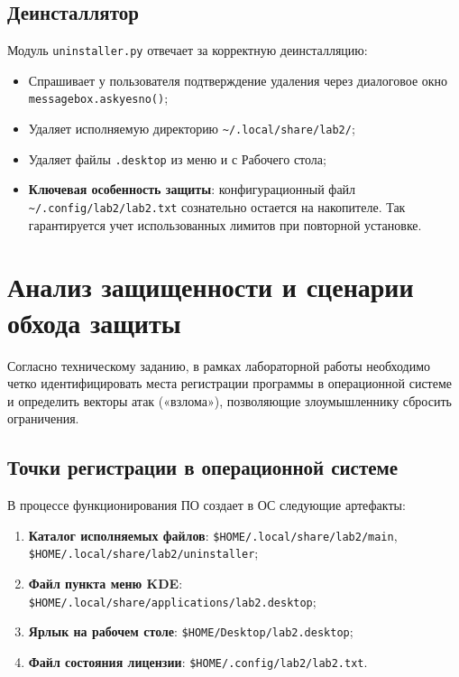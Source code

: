 \documentclass[a4paper]{article}
\begin{document}
\subsection{Деинсталлятор}
Модуль \texttt{uninstaller.py} отвечает за корректную деинсталляцию:
\begin{itemize}
    \item Спрашивает у пользователя подтверждение удаления через диалоговое окно \texttt{messagebox.askyesno()};
    \item Удаляет исполняемую директорию \texttt{\textasciitilde/.local/share/lab2/};
    \item Удаляет файлы \texttt{.desktop} из меню и с Рабочего стола;
    \item \textbf{Ключевая особенность защиты}: конфигурационный файл \texttt{\textasciitilde/.config/lab2/lab2.txt} сознательно остается на накопителе. Так гарантируется учет использованных лимитов при повторной установке.
\end{itemize}

\newpage
\section{Анализ защищенности и сценарии обхода защиты}

Согласно техническому заданию, в рамках лабораторной работы необходимо четко идентифицировать места регистрации программы в операционной системе и определить векторы атак («взлома»), позволяющие злоумышленнику сбросить ограничения.

\subsection{Точки регистрации в операционной системе}
В процессе функционирования ПО создает в ОС следующие артефакты:
\begin{enumerate}
    \item \textbf{Каталог исполняемых файлов}: \texttt{\$HOME/.local/share/lab2/main}, \\ \texttt{\$HOME/.local/share/lab2/uninstaller};
    \item \textbf{Файл пункта меню KDE}: \texttt{\$HOME/.local/share/applications/lab2.desktop};
    \item \textbf{Ярлык на рабочем столе}: \texttt{\$HOME/Desktop/lab2.desktop};
    \item \textbf{Файл состояния лицензии}: \texttt{\$HOME/.config/lab2/lab2.txt}.
\end{enumerate}
\end{document}
